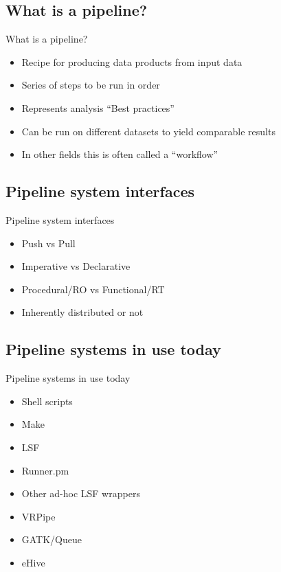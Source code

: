 \documentclass[xcolor=x11names,compress]{beamer}
\renewcommand{\(}{\begin{columns}}
\renewcommand{\)}{\end{columns}}
\newcommand{\<}[1]{\begin{column}{#1}}
\renewcommand{\>}{\end{column}}
\begin{document}
\subsection{What is a pipeline?}
\begin{frame}{What is a pipeline?}
\pipesbackground
\begin{itemize}
\item Recipe for producing data products from input data
\item Series of steps to be run in order
\item Represents analysis ``Best practices''
\item Can be run on different datasets to yield comparable results
\item In other fields this is often called a ``workflow''
\end{itemize}
\end{frame}

\subsection{Pipeline system interfaces}
\begin{frame}{Pipeline system interfaces}
\pipesbackground
\begin{itemize}
\item Push vs Pull
\item Imperative vs Declarative
\item Procedural/RO vs Functional/RT
\item Inherently distributed or not 
\end{itemize}
\end{frame}

\subsection{Pipeline systems in use today}
\begin{frame}{Pipeline systems in use today}
\pipesbackground
\begin{itemize}
\item Shell scripts
\item Make
\item LSF
\item Runner.pm
\item Other ad-hoc LSF wrappers
\item VRPipe
\item GATK/Queue
\item eHive
\end{itemize}
\end{frame}
\end{document}
